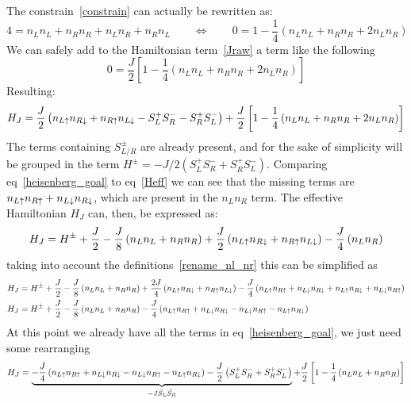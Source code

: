 The constrain~\eqref{constrain} can actually be rewritten as:
\begin{equation}
  4 = n_Ln_L + n_Rn_R + n_Ln_R + n_Rn_L \quad\quad\Leftrightarrow \quad\quad
  0 = 1-\frac{1}{4}\left(n_Ln_L + n_Rn_R + 2n_Ln_R\right)
\label{constrain2}
\end{equation}
We can safely add to the Hamiltonian term~\eqref{Jraw} a term like the following
\begin{equation*}
  0 = \frac{J}{2}\left[1-\frac{1}{4}\left(n_Ln_L + n_Rn_R + 2n_Ln_R\right)\right]
\end{equation*}
Resulting:
\begin{equation}
  H_{J} =\frac{J}{2}\left(n_{L\uparrow}n_{R\downarrow} + n_{R\uparrow}n_{L\downarrow}-
         S^+_LS^-_R - S^+_RS^-_L \right)+
         \frac{J}{2}\left[1-\frac{1}{4}\left(n_Ln_L + n_Rn_R + 2n_Ln_R\right)\right]
\label{Heff}
\end{equation}
The terms containing $S^\pm_{L/R}$ are already present, and for the sake of simplicity will be grouped in the term $H^\pm = -J/2(S^+_LS^-_R + S^+_RS^-_L)$. Comparing eq~\eqref{heisenberg_goal} to eq~\eqref{Heff} we can see that the missing terms are $ n_{L\uparrow}n_{R\uparrow}+n_{L\downarrow}n_{R\downarrow} $, which are present in the $n_Ln_R$ term. The effective Hamiltonian $H_J$ can, then, be expressed as:
\begin{equation}
  H_{J} = H^\pm + \frac{J}{2} - \frac{J}{8}\left(n_Ln_L + n_Rn_R\right)+
    \frac{J}{2}\left(n_{L\uparrow}n_{R\downarrow} + n_{R\uparrow}n_{L\downarrow}\right)-
    \frac{J}{4}\left(n_Ln_R\right)
\end{equation}
taking into account the definitions~\eqref{rename_nl_nr} this can be simplified as
\begin{equation*}
  \begin{split}
      H_{J} &= H^\pm + \frac{J}{2} - \frac{J}{8}\left(n_Ln_L + n_Rn_R\right)+
      \frac{2J}{4}\left(n_{L\uparrow}n_{R\downarrow} + n_{R\uparrow}n_{L\downarrow}\right)-
      \frac{J}{4}\left(n_{L\uparrow}n_{R\uparrow} + n_{L\downarrow}n_{R\downarrow} +
      n_{L\uparrow}n_{R\downarrow} + n_{L\downarrow}n_{R\uparrow}\right)\\
      H_{J} &= H^\pm + \frac{J}{2} - \frac{J}{8}\left(n_Ln_L + n_Rn_R\right)-
      \frac{J}{4}\left(n_{L\uparrow}n_{R\uparrow}+n_{L\downarrow}n_{R\downarrow}-
                        n_{L\downarrow}n_{R\uparrow}-n_{L\uparrow}n_{R\downarrow}\right)
    \end{split}
\end{equation*}
At this point we already have all the terms in eq~\eqref{heisenberg_goal}, we just need some rearranging
\begin{equation}
  H_J = \underbrace{-\frac{J}{4}\left(n_{L\uparrow}n_{R\uparrow}+n_{L\downarrow}n_{R\downarrow}-
    n_{L\downarrow}n_{R\uparrow}-n_{L\uparrow}n_{R\downarrow}\right)
    -\frac{J}{2}\left(S^+_LS^-_R + S^+_RS^-_L\right)}_{-J\vec{S}_L\vec{S}_R}+
        \frac{J}{2}\left[1 - \frac{1}{4}\left(n_Ln_L + n_Rn_R\right)\right]
\end{equation}
